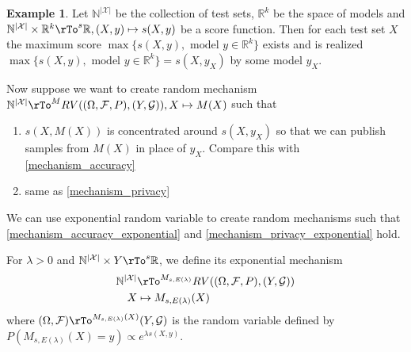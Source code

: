 \documentclass[12pt]{amsart}
\theoremstyle{definition}
\newtheorem{example}[theorem]{Example}
\begin{document}
\begin{example} Let $\mathbb{N}^{|\mathcal{X}|}$ be the collection of test sets, $\mathbb{R}^k$ be the space of models and $\mathbb{N}^{|\mathcal{X}|} \times \mathbb{R}^k \rTo^s \mathbb{R}, (X, y) \mapsto s(X, y)$ be a score function. Then for each test set $X$ the maximum score $\max \{s(X, y), \text{ model } y \in \mathbb{R}^k\}$ exists and is realized $\max \{s(X, y), \text{ model } y \in \mathbb{R}^k\} = s(X, y_X)$ by some model $y_X$.
\end{example}

Now suppose we want to create random mechanism $\mathbb{N}^{|\mathcal{X}|} \rTo^M RV((\Omega, \mathcal{F}, P), (Y, \mathcal{G})), X \mapsto M(X)$ such that
\begin{enumerate}[\indent 1.]
\item \label{mechanism_accuracy_exponential} $s(X, M(X))$ is concentrated around $s(X, y_X)$ so that we can publish samples from $M(X)$ in place of $y_X$. Compare this with \ref{mechanism_accuracy}
\item \label{mechanism_privacy_exponential} same as \ref{mechanism_privacy}
\end{enumerate}

We can use exponential random variable to create random mechanisms such that \ref{mechanism_accuracy_exponential} and \ref{mechanism_privacy_exponential} hold.

\dfn \label{dfn_exponential_mechanism} For $\lambda > 0$ and $\mathbb{N}^{|\mathcal{X}|} \times Y \rTo^s \mathbb{R}$, we define its exponential mechanism
\begin{align*}
\mathbb{N}^{|\mathcal{X}|} & \rTo^{M_{s, E(\lambda)}} RV((\Omega, \mathcal{F}, P), (Y, \mathcal{G})) \\
X & \mapsto M_{s, E(\lambda)}(X) \\
\end{align*}
where $(\Omega, \mathcal{F}) \rTo^{M_{s, E(\lambda)}(X)} (Y, \mathcal{G})$ is the random variable defined by $P(M_{s, E(\lambda)}(X) = y) \propto e^{\lambda s(X, y)}$.
\end{document}
